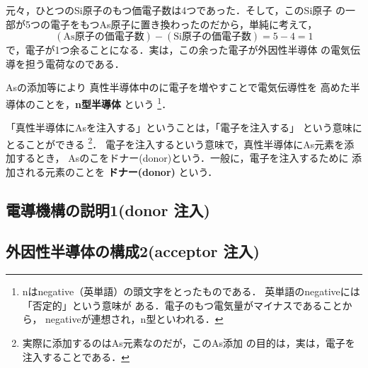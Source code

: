             元々，ひとつのSi原子のもつ価電子数は4つであった．そして，このSi原子
            の一部が5つの電子をもつAs原子に置き換わったのだから，単純に考えて，
                \begin{equation*}
                    (\mathrm{As}\mbox{原子の価電子数}) - (\mathrm{Si}\mbox{原子の価電子数}) = 5 -4 = 1
                \end{equation*}
            で，電子が1つ余ることになる．実は，この余った電子が外因性半導体
            の電気伝導を担う電荷なのである．

            Asの添加等により
            真性半導体中のに電子を増やすことで電気伝導性を
            高めた半導体のことを，\textbf{n型半導体} という
                \footnote{
                    nはnegative（英単語）の頭文字をとったものである．
                    英単語のnegativeには「否定的」という意味が
                    ある．電子のもつ電気量がマイナスであることから，
                    negativeが連想され，n型といわれる．
                }．

            「真性半導体にAsを注入する」ということは，「電子を注入する」
            という意味にとることができる
                \footnote{
                    実際に添加するのはAs元素なのだが，このAs添加
                    の目的は，実は，電子を注入することである．
                }．
            電子を注入するという意味で，真性半導体にAs元素を添加するとき，
            Asのこをドナー(donor)という．一般に，電子を注入するために
            添加される元素のことを \textbf{ドナー(donor)} という．

        \subsection{電導機構の説明1(donor 注入)}

        \subsection{外因性半導体の構成2(acceptor 注入)}

